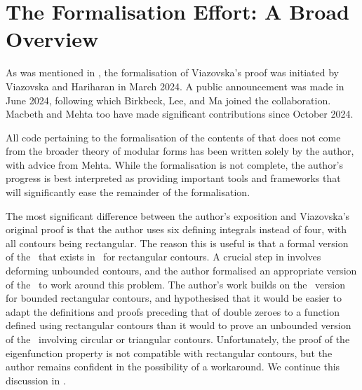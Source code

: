 \section{The Formalisation Effort: A Broad Overview}
\label{Ch5:Sec:Gen_Overview_of_Formalisation}

As was mentioned in , the formalisation of Viazovska's proof was initiated by Viazovska and Hariharan in March 2024. A public announcement was made in June 2024, following which Birkbeck, Lee, and Ma joined the collaboration. Macbeth and Mehta too have made significant contributions since October 2024.

All code pertaining to the formalisation of the contents of  that does not come from the broader theory of modular forms has been written solely by the author, with advice from Mehta. While the formalisation is not complete, the author's progress is best interpreted as providing important tools and frameworks that will significantly ease the remainder of the formalisation.

The most significant difference between the author's exposition and Viazovska's original proof is that the author uses six defining integrals instead of four, with all contours being rectangular. The reason this is useful is that a formal version of the \CGT\ that exists in \mathlib\ for rectangular contours. A crucial step in  involves deforming unbounded contours, and the author formalised an appropriate version of the \CGT\ to work around this problem. The author's work builds on the \mathlib\ version for bounded rectangular contours, and hypothesised that it would be easier to adapt the definitions and proofs preceding that of double zeroes to a function defined using rectangular contours than it would to prove an unbounded version of the \CGT\ involving circular or triangular contours. Unfortunately, the proof of the eigenfunction property is not compatible with rectangular contours, but the author remains confident in the possibility of a workaround. We continue this discussion in .

